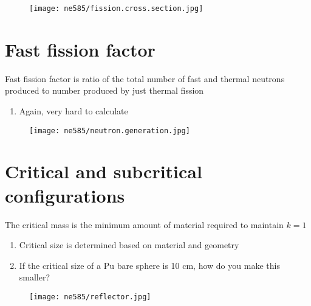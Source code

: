 \documentclass[aspectratio=1610,pdftex,dvipsnames,compress,xcolor={dvipsnames}]{beamer}
\begin{document}
\begin{frame}{}
    \begin{figure}
        \centering
        \texttt{[image: ne585/fission.cross.section.jpg]}
    \end{figure}
\end{frame}


\section{Fast fission factor}


\addtocounter{framenumber}{-1} 
\begin{frame}{Fast fission factor is ratio of the total number of fast and thermal neutrons produced to number produced by just thermal fission}
    \begin{enumerate}[series=outerlist,topsep=0pt,itemsep=21pt,leftmargin=*,label=(\arabic*)]
        \item[]Again, very hard to calculate
    \end{enumerate}
\end{frame}


\begin{frame}{}
    \begin{figure}
        \centering
        \texttt{[image: ne585/neutron.generation.jpg]}
    \end{figure}
\end{frame}


\section{Critical and subcritical configurations}


\addtocounter{framenumber}{-1} 
\begin{frame}{The critical mass is the minimum amount of material required to maintain $k = 1$}
    \begin{enumerate}[series=outerlist,topsep=0pt,itemsep=21pt,leftmargin=*,label=(\arabic*)]
        \item[]Critical size is determined based on material and geometry
        \item[]If the critical size of a Pu bare sphere is 10 cm, how do you make this smaller?
    \end{enumerate}

    \vspace*{\fill}

    \begin{figure}
        \centering
        \texttt{[image: ne585/reflector.jpg]}
    \end{figure}
\end{frame}
\end{document}
